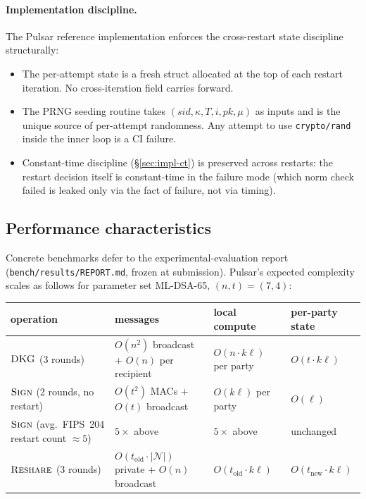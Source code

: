 \documentclass[11pt,a4paper]{article}
\theoremstyle{definition}
\theoremstyle{remark}
\newcommand{\Sign}{\textsc{Sign}}
\newcommand{\DKG}{\textsc{DKG}}
\newcommand{\Reshare}{\textsc{Reshare}}
\begin{document}
\paragraph{Implementation discipline.}
The Pulsar reference implementation enforces the cross-restart
state discipline structurally:

\begin{itemize}[leftmargin=*, itemsep=0pt]
\item The per-attempt state is a fresh struct allocated at the top
of each restart iteration. No cross-iteration field carries forward.
\item The PRNG seeding routine takes
$(\mathit{sid}, \kappa, T, i, \mathit{pk}, \mu)$ as inputs and is
the unique source of per-attempt randomness. Any attempt to use
\texttt{crypto/rand} inside the inner loop is a CI failure.
\item Constant-time discipline (\S\ref{sec:impl-ct}) is preserved
across restarts: the restart decision itself is constant-time in
the failure mode (which norm check failed is leaked only via the
fact of failure, not via timing).
\end{itemize}

\subsection{Performance characteristics}
\label{sec:impl-perf}

Concrete benchmarks defer to the experimental-evaluation report
(\texttt{bench/results/REPORT.md}, frozen at submission). Pulsar's
expected complexity scales as follows for parameter set ML-DSA-65,
$(n, t) = (7, 4)$:

\begin{center}
\begin{tabular}{l l l l}
\toprule
operation & messages & local compute & per-party state \\
\midrule
$\DKG$ (3 rounds)
& $O(n^2)$ broadcast + $O(n)$ per recipient
& $O(n \cdot k \ell)$ per party
& $O(t \cdot k \ell)$ \\
$\Sign$ (2 rounds, no restart)
& $O(t^2)$ MACs + $O(t)$ broadcast
& $O(k \ell)$ per party
& $O(\ell)$ \\
$\Sign$ (avg.\ FIPS~204 restart count $\approx 5$)
& $5 \times$ above
& $5 \times$ above
& unchanged \\
$\Reshare$ (3 rounds)
& $O(t_{\mathrm{old}} \cdot |\mathcal{N}|)$ private + $O(n)$ broadcast
& $O(t_{\mathrm{old}} \cdot k \ell)$
& $O(t_{\mathrm{new}} \cdot k \ell)$ \\
\bottomrule
\end{tabular}
\end{center}
\end{document}

